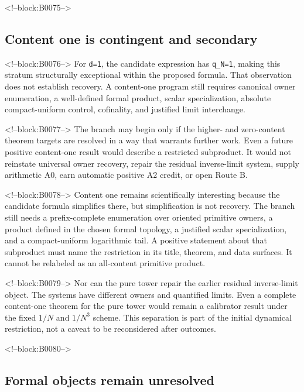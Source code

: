 \documentclass[11pt]{article}
\begin{document}
<!--block:B0075-->
\hypertarget{44-content-one-is-contingent-and-secondary}{%
\subsection{Content one is contingent and
secondary}\label{44-content-one-is-contingent-and-secondary}}

<!--block:B0076-->
For \texttt{d=1}, the candidate expression has \texttt{q\_N=1}, making
this stratum structurally exceptional within the proposed formula. That
observation does not establish recovery. A content-one program still
requires canonical owner enumeration, a well-defined formal product,
scalar specialization, absolute compact-uniform control, cofinality, and
justified limit interchange.

<!--block:B0077-->
The branch may begin only if the higher- and zero-content theorem
targets are resolved in a way that warrants further work. Even a future
positive content-one result would describe a restricted subproduct. It
would not reinstate universal owner recovery, repair the residual
inverse-limit system, supply arithmetic A0, earn automatic positive A2
credit, or open Route B.

<!--block:B0078-->
Content one remains scientifically interesting because the candidate
formula simplifies there, but simplification is not recovery. The
branch still needs a prefix-complete enumeration over oriented primitive
owners, a product defined in the chosen formal topology, a justified
scalar specialization, and a compact-uniform logarithmic tail. A
positive statement about that subproduct must name the restriction in
its title, theorem, and data surfaces. It cannot be relabeled as an
all-content primitive product.

<!--block:B0079-->
Nor can the pure tower repair the earlier residual inverse-limit object.
The systems have different owners and quantified limits. Even a
complete content-one theorem for the pure tower would remain a
calibrator result under the fixed $1/N$ and $1/N^3$ scheme. This
separation is part of the initial dynamical restriction, not a caveat to
be reconsidered after outcomes.

<!--block:B0080-->
\hypertarget{45-formal-objects-remain-unresolved}{%
\subsection{Formal objects remain
unresolved}\label{45-formal-objects-remain-unresolved}}
\end{document}
